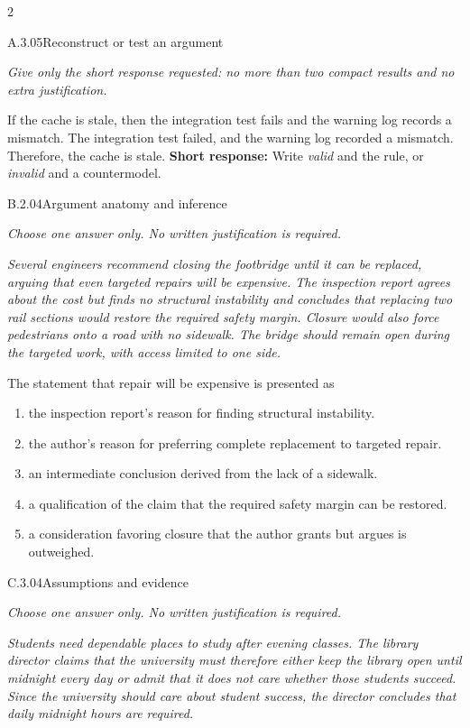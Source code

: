\documentclass[9pt]{extarticle}
\newcommand{\choice}[1]{\item #1}
\begin{document}
\CoreWorkArea
\FormBreak
{}
\begin{multicols}{2}
\begin{DenseCoreProblem}{A.3.05}{Reconstruct or test an argument}
{\scriptsize\textit{Give only the short response requested: no more than two compact results and no extra justification.}\par}
If the cache is stale, then the integration test fails and the warning log records a mismatch. The integration test failed, and the warning log recorded a mismatch. Therefore, the cache is stale.
\textbf{Short response:} Write \emph{valid} and the rule, or \emph{invalid} and a countermodel.
\end{DenseCoreProblem}
\begin{DenseCoreProblem}{B.2.04}{Argument anatomy and inference}
{\scriptsize\textit{Choose one answer only. No written justification is required.}\par}
\emph{Several engineers recommend closing the footbridge until it can be replaced, arguing that even targeted repairs will be expensive. The inspection report agrees about the cost but finds no structural instability and concludes that replacing two rail sections would restore the required safety margin. Closure would also force pedestrians onto a road with no sidewalk. The bridge should remain open during the targeted work, with access limited to one side.}

The statement that repair will be expensive is presented as
\begin{enumerate}[label=(\alph*)]
  \choice{the inspection report's reason for finding structural instability.}
  \choice{the author's reason for preferring complete replacement to targeted repair.}
  \choice{an intermediate conclusion derived from the lack of a sidewalk.}
  \choice{a qualification of the claim that the required safety margin can be restored.}
  \choice{a consideration favoring closure that the author grants but argues is outweighed.}
\end{enumerate}
\end{DenseCoreProblem}
\columnbreak
\begin{DenseCoreProblem}{C.3.04}{Assumptions and evidence}
{\scriptsize\textit{Choose one answer only. No written justification is required.}\par}
\emph{Students need dependable places to study after evening classes. The library director claims that the university must therefore either keep the library open until midnight every day or admit that it does not care whether those students succeed. Since the university should care about student success, the director concludes that daily midnight hours are required.}


\end{DenseCoreProblem}
\end{multicols}
\end{document}
